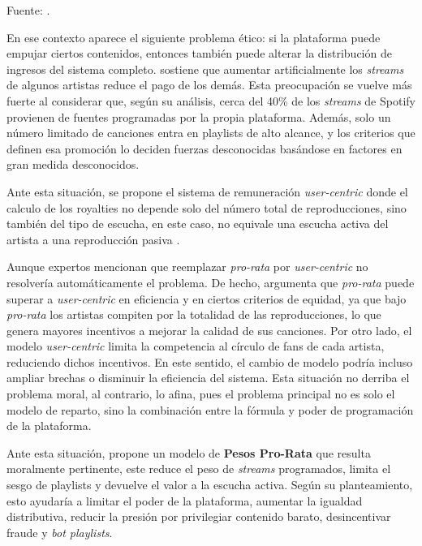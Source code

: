 \documentclass[12pt,a4paper]{article}
\begin{document}
Fuente: \cite{fake_artists_spotify_2024}.

En ese contexto aparece el siguiente problema ético: si la plataforma puede empujar ciertos contenidos, entonces también puede alterar la distribución de ingresos del sistema completo.  sostiene que aumentar artificialmente los \textit{streams} de algunos artistas reduce el pago de los demás. Esta preocupación se vuelve más fuerte al considerar que, según su análisis, cerca del 40\% de los \textit{streams} de Spotify provienen de fuentes programadas por la propia plataforma. Además, solo un número limitado de canciones entra en playlists de alto alcance, y los criterios que definen esa promoción lo deciden fuerzas desconocidas basándose en factores en gran medida desconocidos.

Ante esta situación, se propone el sistema de remuneración \textit{user-centric} donde el calculo de los royalties no depende solo del número total de reproducciones, sino también del tipo de escucha, en este caso, no equivale una escucha activa del artista a una reproducción pasiva \cite{umaw_justice_spotify}.

Aunque expertos mencionan que reemplazar \textit{pro-rata} por \textit{user-centric} no resolvería automáticamente el problema. De hecho,  argumenta que \textit{pro-rata} puede superar a \textit{user-centric} en eficiencia y en ciertos criterios de equidad, ya que bajo \textit{pro-rata} los artistas compiten por la totalidad de las reproducciones, lo que genera mayores incentivos a mejorar la calidad de sus canciones. Por otro lado, el modelo \textit{user-centric} limita la competencia al círculo de fans de cada artista, reduciendo dichos incentivos. En este sentido, el cambio de modelo podría incluso ampliar brechas o disminuir la eficiencia del sistema. Esta situación no derriba el problema moral, al contrario, lo afina, pues el problema principal no es solo el modelo de reparto, sino la combinación entre la fórmula y poder de programación de la plataforma.

Ante esta situación,  propone un modelo de \textbf{Pesos Pro-Rata} que resulta moralmente pertinente, este reduce el peso de \textit{streams} programados, limita el sesgo de playlists y devuelve el valor a la escucha activa. Según su planteamiento, esto ayudaría a limitar el poder de la plataforma, aumentar la igualdad distributiva, reducir la presión por privilegiar contenido barato, desincentivar fraude y \textit{bot playlists}.
\end{document}
